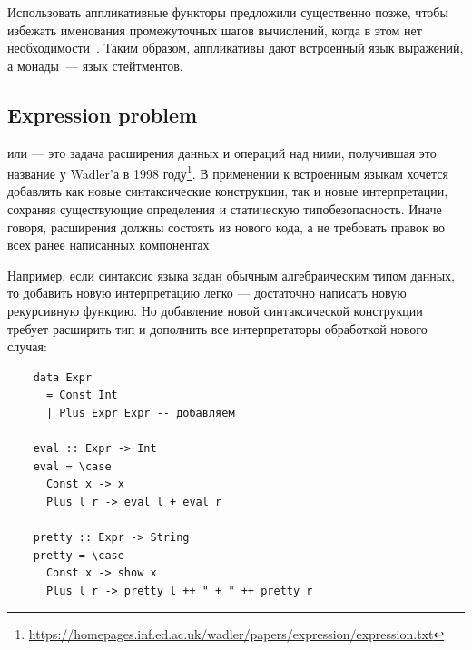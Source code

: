 Использовать аппликативные функторы предложили существенно позже, чтобы избежать именования промежуточных шагов вычислений, когда в этом нет необходимости~\cite{mcbride2008applicative}.
Таким образом, аппликативы дают встроенный язык выражений, а монады~--- язык стейтментов.

%
%
%

\subsection{Expression problem} \label{subsec:expression-problem}

 или  --- это задача расширения данных и операций над ними, получившая это название у Wadler'а в 1998 году\footnote{\url{https://homepages.inf.ed.ac.uk/wadler/papers/expression/expression.txt}}.
В применении к встроенным языкам хочется добавлять как новые синтаксические конструкции, так и новые интерпретации, сохраняя существующие определения и статическую типобезопасность.
Иначе говоря, расширения должны состоять из нового кода, а не требовать правок во всех ранее написанных компонентах.

Например, если синтаксис языка задан обычным алгебраическим типом данных, то добавить новую интерпретацию легко --- достаточно написать новую рекурсивную функцию.
Но добавление новой синтаксической конструкции требует расширить тип и дополнить все интерпретаторы обработкой нового случая:
\begin{verbatim}
    data Expr
      = Const Int
      | Plus Expr Expr -- добавляем

    eval :: Expr -> Int
    eval = \case
      Const x -> x
      Plus l r -> eval l + eval r

    pretty :: Expr -> String
    pretty = \case
      Const x -> show x
      Plus l r -> pretty l ++ " + " ++ pretty r
\end{verbatim}

